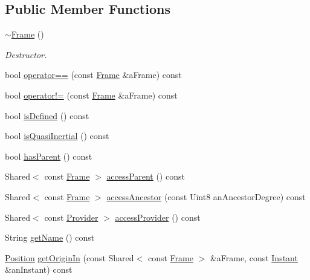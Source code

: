 \subsection*{Public Member Functions}
\begin{DoxyCompactItemize}
\item 
\hyperlink{classostk_1_1physics_1_1coord_1_1_frame_a9c8b5b7869ee8e730e0b23be60920a9d}{$\sim$\+Frame} ()
\begin{DoxyCompactList}\small\item\em Destructor. \end{DoxyCompactList}\item 
bool \hyperlink{classostk_1_1physics_1_1coord_1_1_frame_a010fbd30fe3a937d44d0fbbdeb60222b}{operator==} (const \hyperlink{classostk_1_1physics_1_1coord_1_1_frame}{Frame} \&a\+Frame) const
\item 
bool \hyperlink{classostk_1_1physics_1_1coord_1_1_frame_a12a5cb341c34a404f220b0940a5dff79}{operator!=} (const \hyperlink{classostk_1_1physics_1_1coord_1_1_frame}{Frame} \&a\+Frame) const
\item 
bool \hyperlink{classostk_1_1physics_1_1coord_1_1_frame_a3c4750cec74616ad3e48adf31c314756}{is\+Defined} () const
\item 
bool \hyperlink{classostk_1_1physics_1_1coord_1_1_frame_ac0f7d78be14f09ccef5b862c4f963da8}{is\+Quasi\+Inertial} () const
\item 
bool \hyperlink{classostk_1_1physics_1_1coord_1_1_frame_aa4c778fa91e6599cdea0a889fd5bf69c}{has\+Parent} () const
\item 
Shared$<$ const \hyperlink{classostk_1_1physics_1_1coord_1_1_frame}{Frame} $>$ \hyperlink{classostk_1_1physics_1_1coord_1_1_frame_a549b54435e1a47193ff7288df9d2b0cb}{access\+Parent} () const
\item 
Shared$<$ const \hyperlink{classostk_1_1physics_1_1coord_1_1_frame}{Frame} $>$ \hyperlink{classostk_1_1physics_1_1coord_1_1_frame_af2276e1ed3a74752194ae3414b10636d}{access\+Ancestor} (const Uint8 an\+Ancestor\+Degree) const
\item 
Shared$<$ const \hyperlink{classostk_1_1physics_1_1coord_1_1frame_1_1_provider}{Provider} $>$ \hyperlink{classostk_1_1physics_1_1coord_1_1_frame_a60c1717e04993577c0dcf4eae23be672}{access\+Provider} () const
\item 
String \hyperlink{classostk_1_1physics_1_1coord_1_1_frame_a47aca195a73e14198f6d615c8988ce6e}{get\+Name} () const
\item 
\hyperlink{classostk_1_1physics_1_1coord_1_1_position}{Position} \hyperlink{classostk_1_1physics_1_1coord_1_1_frame_a9f0544fd284d2ff4bca6a54dc8835bff}{get\+Origin\+In} (const Shared$<$ const \hyperlink{classostk_1_1physics_1_1coord_1_1_frame}{Frame} $>$ \&a\+Frame, const \hyperlink{classostk_1_1physics_1_1time_1_1_instant}{Instant} \&an\+Instant) const

\end{DoxyCompactItemize}
